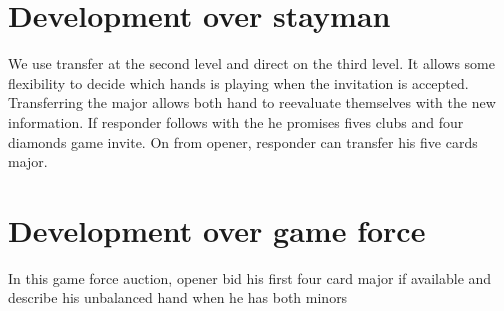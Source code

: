 \section{Development over \bid{2\CS} stayman}
We use transfer at the second level and direct on the third level. It allows some flexibility to decide which hands is playing when the invitation is accepted.
Transferring the major allows both hand to reevaluate themselves with the new information. If responder follows with the \bid{3\CS} he promises fives clubs and four diamonds game invite. On \bid{2\NT} from opener, {\color{red} responder can transfer his five cards major}.
\section{Development over \bid{2\DS} game force}
In this game force auction, opener bid his first four card major if available and describe his unbalanced hand when he has both minors






